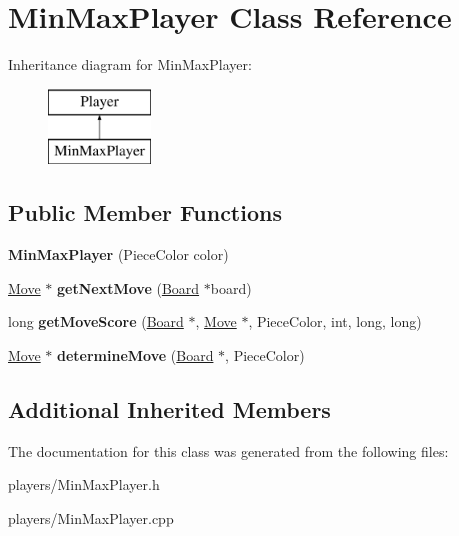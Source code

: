 \hypertarget{class_min_max_player}{}\section{Min\+Max\+Player Class Reference}
\label{class_min_max_player}
Inheritance diagram for Min\+Max\+Player\+:\begin{figure}[H]
\begin{center}
\leavevmode
\includegraphics[height=2.000000cm]{class_min_max_player}
\end{center}
\end{figure}
\subsection*{Public Member Functions}
\begin{DoxyCompactItemize}
\item 
\mbox{\label{class_min_max_player_a145255a37fa1c12d9cd0db6c132732b6}} 
{\bfseries Min\+Max\+Player} (Piece\+Color color)
\item 
\mbox{\label{class_min_max_player_a1330801ee17c3acce9d3245d27bd41a6}} 
\mbox{\hyperlink{class_move}{Move}} $\ast$ {\bfseries get\+Next\+Move} (\mbox{\hyperlink{class_board}{Board}} $\ast$board)
\item 
\mbox{\label{class_min_max_player_aedd032551771faa29a729d0733e9cab4}} 
long {\bfseries get\+Move\+Score} (\mbox{\hyperlink{class_board}{Board}} $\ast$, \mbox{\hyperlink{class_move}{Move}} $\ast$, Piece\+Color, int, long, long)
\item 
\mbox{\label{class_min_max_player_a75472f13216313417a63c55aa493522b}} 
\mbox{\hyperlink{class_move}{Move}} $\ast$ {\bfseries determine\+Move} (\mbox{\hyperlink{class_board}{Board}} $\ast$, Piece\+Color)
\end{DoxyCompactItemize}
\subsection*{Additional Inherited Members}


The documentation for this class was generated from the following files\+:\begin{DoxyCompactItemize}
\item 
players/Min\+Max\+Player.\+h\item 
players/Min\+Max\+Player.\+cpp\end{DoxyCompactItemize}

